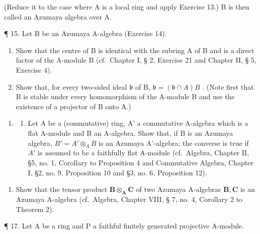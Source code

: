 (Reduce it to the case where A is a local ring and apply Exercise 13.) B is then called an Azumaya algebra over A.

¶ 15. Let B be an Azumaya A-algebra (Exercise 14).

\begin{enumerate}
\def\labelenumi{(\alph{enumi})}
\item
  Show that the centre of B is identical with the subring A of B and is a direct factor of the A-module B (cf.~Chapter I, § 2, Exercise 21 and Chapter II, § 5, Exercise 4).
\item
  Show that, for every two-sided ideal \(\mathfrak{b}\) of B, \(\mathfrak{b} = (\mathfrak{b} \cap A)B\) . (Note first that B is stable under every homomorphism of the A-module B and use the existence of a projector of B onto A.)
\end{enumerate}

\begin{enumerate}
\def\labelenumi{\arabic{enumi}.}
\setcounter{enumi}{15}
\tightlist
\item
  \begin{enumerate}
  \def\labelenumii{(\alph{enumii})}
  \tightlist
  \item
    Let A be a (commutative) ring, A' a commutative A-algebra which is a flat A-module and B an A-algebra. Show that, if B is an Azumaya algebra, \(B' = A' \otimes_{A} B\) is an Azumaya A'-algebra; the converse is true if \(A'\) is assumed to be a faithfully flat A-module (cf.~Algebra, Chapter II, §5, no. 1, Corollary to Proposition 4 and Commutative Algebra, Chapter I, §2, no. 9, Proposition 10 and §3, no. 6, Proposition 12).
  \end{enumerate}
\end{enumerate}

\begin{enumerate}
\def\labelenumi{(\alph{enumi})}
\setcounter{enumi}{1}
\tightlist
\item
  Show that the tensor product \(\mathbf{B} \otimes_{\mathbf{A}} \mathbf{C}\) of two Azumaya A-algebras \(\mathbf{B}, \mathbf{C}\) is an Azumaya A-algebra (cf.~Algebra, Chapter VIII, § 7, no. 4, Corollary 2 to Theorem 2).
\end{enumerate}

¶ 17. Let A be a ring and P a faithful finitely generated projective A-module.

